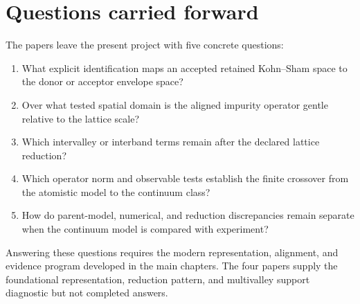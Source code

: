 \section{Questions carried forward}

The papers leave the present project with five concrete questions:
\begin{enumerate}
  \item What explicit identification maps an accepted retained Kohn--Sham space
    to the donor or acceptor envelope space?
  \item Over what tested spatial domain is the aligned impurity operator gentle
    relative to the lattice scale?
  \item Which intervalley or interband terms remain after the declared lattice
    reduction?
  \item Which operator norm and observable tests establish the finite crossover
    from the atomistic model to the continuum class?
  \item How do parent-model, numerical, and reduction discrepancies remain
    separate when the continuum model is compared with experiment?
\end{enumerate}
Answering these questions requires the modern representation, alignment, and
evidence program developed in the main chapters. The four papers supply the
foundational representation, reduction pattern, and multivalley support
diagnostic but not completed answers.
